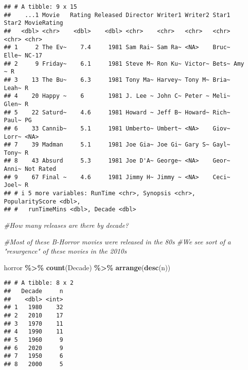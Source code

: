 \documentclass[
]{article}
\newenvironment{Shaded}{\begin{snugshade}}{\end{snugshade}}
\newcommand{\CommentTok}[1]{\textcolor[rgb]{0.56,0.35,0.01}{\textit{#1}}}
\newcommand{\FunctionTok}[1]{\textcolor[rgb]{0.13,0.29,0.53}{\textbf{#1}}}
\newcommand{\NormalTok}[1]{#1}
\newcommand{\SpecialCharTok}[1]{\textcolor[rgb]{0.81,0.36,0.00}{\textbf{#1}}}
\begin{document}
\begin{verbatim}
## # A tibble: 9 x 15
##    ...1 Movie   Rating Released Director Writer1 Writer2 Star1 Star2 MovieRating
##   <dbl> <chr>    <dbl>    <dbl> <chr>    <chr>   <chr>   <chr> <chr> <chr>      
## 1     2 The Ev~    7.4     1981 Sam Rai~ Sam Ra~ <NA>    Bruc~ Elle~ NC-17      
## 2     9 Friday~    6.1     1981 Steve M~ Ron Ku~ Victor~ Bets~ Amy ~ R          
## 3    13 The Bu~    6.3     1981 Tony Ma~ Harvey~ Tony M~ Bria~ Leah~ R          
## 4    20 Happy ~    6       1981 J. Lee ~ John C~ Peter ~ Meli~ Glen~ R          
## 5    22 Saturd~    4.6     1981 Howard ~ Jeff B~ Howard~ Rich~ Paul~ PG         
## 6    33 Cannib~    5.1     1981 Umberto~ Umbert~ <NA>    Giov~ Lorr~ <NA>       
## 7    39 Madman     5.1     1981 Joe Gia~ Joe Gi~ Gary S~ Gayl~ Tony~ R          
## 8    43 Absurd     5.3     1981 Joe D'A~ George~ <NA>    Geor~ Anni~ Not Rated  
## 9    67 Final ~    4.6     1981 Jimmy H~ Jimmy ~ <NA>    Ceci~ Joel~ R          
## # i 5 more variables: RunTime <chr>, Synopsis <chr>, PopularityScore <dbl>,
## #   runTimeMins <dbl>, Decade <dbl>
\end{verbatim}

\begin{Shaded}
\begin{Highlighting}[]
\CommentTok{\#How many releases are there by decade? }

\CommentTok{\#Most of these B{-}Horror movies were released in the 80\textquotesingle{}s}
\CommentTok{\#We see sort of a "resurgence" of these movies in the 2010\textquotesingle{}s}

\NormalTok{horror }\SpecialCharTok{\%\textgreater{}\%} 
  \FunctionTok{count}\NormalTok{(Decade) }\SpecialCharTok{\%\textgreater{}\%} 
  \FunctionTok{arrange}\NormalTok{(}\FunctionTok{desc}\NormalTok{(n))}
\end{Highlighting}
\end{Shaded}

\begin{verbatim}
## # A tibble: 8 x 2
##   Decade     n
##    <dbl> <int>
## 1   1980    32
## 2   2010    17
## 3   1970    11
## 4   1990    11
## 5   1960     9
## 6   2020     9
## 7   1950     6
## 8   2000     5
\end{verbatim}
\end{document}
